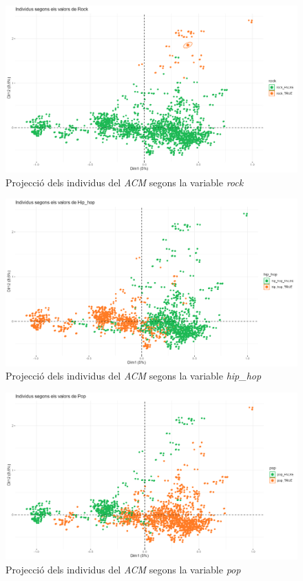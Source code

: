 \begin{figure}[H]
    \centering
    \includegraphics[width=0.7\linewidth]{Images/6_Factorial_Methods/ACM/ACM1_indByVarsRock.png}
    \caption{Projecció dels individus del \textit{ACM} segons la variable \textit{rock}}
    \label{fig:ACM1_indByVarsRock}
\end{figure}

\begin{figure}[H]
    \centering
    \includegraphics[width=0.7\linewidth]{Images/6_Factorial_Methods/ACM/ACM1_indByVarsHipHop.png}
    \caption{Projecció dels individus del \textit{ACM} segons la variable \textit{hip\_hop}}
    \label{fig:ACM1_indByVarsHipHop}
\end{figure}

\begin{figure}[H]
    \centering
    \includegraphics[width=0.7\linewidth]{Images/6_Factorial_Methods/ACM/ACM1_indByVarsPop.png}
    \caption{Projecció dels individus del \textit{ACM} segons la variable \textit{pop}}
    \label{fig:ACM1_indByVarsPop}
\end{figure}

